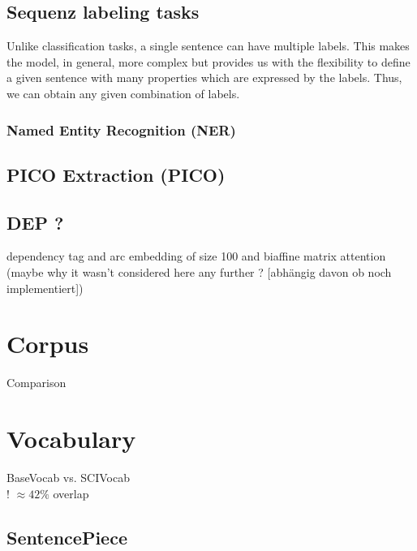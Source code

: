 \subsection{Sequenz labeling tasks}
Unlike classification tasks, a single sentence can have multiple labels. This makes the model, in general, more complex but provides us with the flexibility to define a given sentence with many properties which are expressed by the labels. Thus, we can obtain any given combination of labels.
\subsubsection{Named Entity Recognition (NER)}
\subsection{PICO Extraction (PICO)}

\color{ForestGreen}
\subsection{DEP ?}
dependency  tag and arc embedding of size 100 and biaffine matrix attention \\
(maybe why it wasn't considered here any further ? [abhängig davon ob noch implementiert])

\section{Corpus}
Comparison
\section{Vocabulary}
BaseVocab vs. SCIVocab\\
! $\approx 42\%$ overlap
\subsection{SentencePiece}
\color{black}